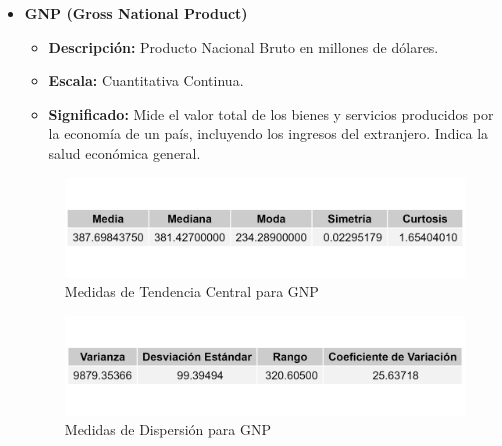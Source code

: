 \documentclass{article}
\begin{document}
\begin{itemize}
    \item \textbf{GNP (Gross National Product)}
    \begin{itemize}
        \item \textbf{Descripción:} Producto Nacional Bruto en millones de dólares.
        \item \textbf{Escala:} Cuantitativa Continua.
        \item \textbf{Significado:} Mide el valor total de los bienes y servicios producidos por la economía de un país, incluyendo los ingresos del extranjero. Indica la salud económica general.
    \end{itemize}
    \begin{figure}[H]
        \centering
        \includegraphics[width=\textwidth]{MTC/GNP_central.png}
        \caption{Medidas de Tendencia Central para GNP}
    \end{figure}
    \begin{figure}[H]
        \centering
        \includegraphics[width=\textwidth]{MTC/GNP_dispersion.png}
        \caption{Medidas de Dispersión para GNP}
    \end{figure}
    

\end{itemize}
\end{document}
